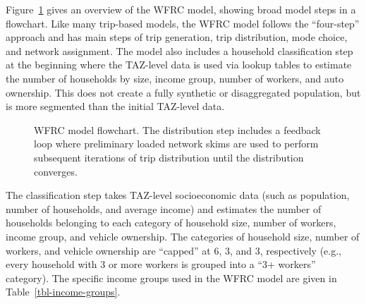 \documentclass[fancy, oneside, mastersfancy, ms]{byuthesis}
\begin{document}
Figure~\ref{fig-wfrc-flowchart} gives an overview of the WFRC model,
showing broad model steps in a flowchart. Like many trip-based models,
the WFRC model follows the ``four-step'' approach and has main steps of
trip generation, trip distribution, mode choice, and network assignment.
The model also includes a household classification step at the beginning
where the TAZ-level data is used via lookup tables to estimate the
number of households by size, income group, number of workers, and auto
ownership. This does not create a fully synthetic or disaggregated
population, but is more segmented than the initial TAZ-level data.

\begin{figure}


\caption[WFRC model flowchart.]{\label{fig-wfrc-flowchart}WFRC model
flowchart. The distribution step includes a feedback loop where
preliminary loaded network skims are used to perform subsequent
iterations of trip distribution until the distribution converges.}

\end{figure}%

The classification step takes TAZ-level socioeconomic data (such as
population, number of households, and average income) and estimates the
number of households belonging to each category of household size,
number of workers, income group, and vehicle ownership. The categories
of household size, number of workers, and vehicle ownership are
``capped'' at 6, 3, and 3, respectively (e.g., every household with 3 or
more workers is grouped into a ``3+ workers'' category). The specific
income groups used in the WFRC model are given in
Table~\ref{tbl-income-groups}.
\end{document}
